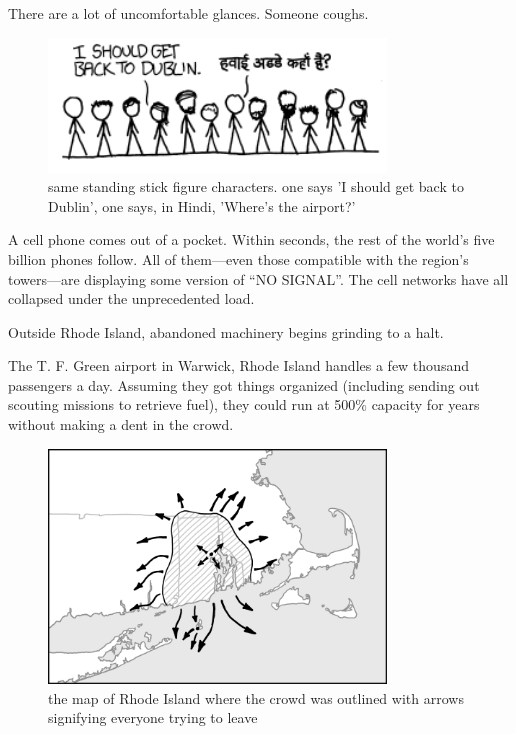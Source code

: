 {There are a lot of uncomfortable glances. Someone coughs.}

\begin{figure}[!htbp]
\centering
\includegraphics[scale=0.5, max width=0.8\textwidth]{imgs/a/8/everybody_jump_talking2.png}
\caption{same standing stick figure characters. one says 'I should get back to Dublin', one says, in Hindi, 'Where's the airport?'}
\end{figure}

{A cell phone comes out of a pocket. Within seconds, the rest of the world’s five billion phones follow. All of them—even those compatible with the region’s towers—are displaying some version of “NO SIGNAL”. The cell networks have all collapsed under the unprecedented load.}

{Outside Rhode Island, abandoned machinery begins grinding to a halt.}

{The T. F. Green airport in Warwick, Rhode Island handles a few thousand passengers a day. Assuming they got things organized (including sending out scouting missions to retrieve fuel), they could run at 500\% capacity for years without making a dent in the crowd.}

\begin{figure}[!htbp]
\centering
\includegraphics[scale=0.5, max width=0.8\textwidth]{imgs/a/8/everybody_jump_map2.png}
\caption{the map of Rhode Island where the crowd was outlined with arrows signifying everyone trying to leave}
\end{figure}

